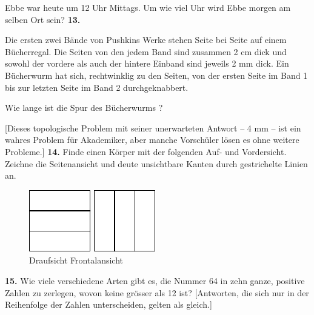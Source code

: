 \documentclass[12pt]{article} %
\begin{document}
Ebbe war heute um 12 Uhr Mittags. Um wie viel Uhr wird Ebbe morgen am selben Ort sein?
\newline\newline\quad
{\bf 13.} 

Die ersten zwei Bände von Pushkins Werke stehen Seite bei Seite auf einem Bücherregal. Die Seiten von den jedem Band sind zusammen 2 cm dick und sowohl der vordere als auch der hintere Einband sind jeweils 2 mm dick. Ein Bücherwurm hat sich, rechtwinklig zu den Seiten, von der ersten Seite im Band 1 bis zur letzten Seite im Band 2 durchgeknabbert. 

Wie lange ist die Spur des Bücherwurms ?

[Dieses topologische Problem mit seiner unerwarteten Antwort -- 4 mm -- ist ein wahres Problem für Akademiker, aber manche Vorschüler lösen es ohne weitere Probleme.]
\newline\newline\quad
{\bf 14.} Finde einen Körper mit der folgenden Auf- und Vordersicht. Zeichne die Seitenansicht  und deute unsichtbare Kanten durch gestrichelte Linien an. 
\begin{figure}[h]
\centering
\footnotesize
\includegraphics[scale=1]{taskbook-99} \qquad\qquad
\includegraphics[scale=1]{taskbook-98}
\\[2pt]
\hspace{1pt} 
Draufsicht
\hspace{43pt} Frontalansicht
\end{figure}
\newline\quad
{\bf 15.} Wie viele verschiedene Arten gibt es, die Nummer 64 in zehn ganze, positive Zahlen zu zerlegen, wovon keine grösser als 12 ist?
[Antworten, die sich nur in der Reihenfolge der Zahlen unterscheiden, gelten als gleich.]
\newline\newline\quad
\end{document}
